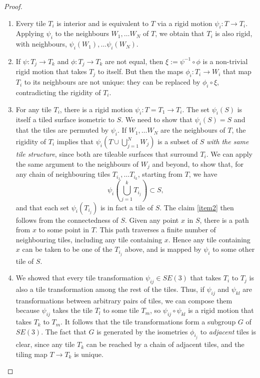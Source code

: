 \documentclass[11pt]{amsart}
\theoremstyle{remark}
\begin{document}
 \begin{proof}
 \begin{enumerate}
 \item Every tile $T_i$ is interior and is equivalent to $T$ via a rigid motion $\psi_i: T \to T_i$.
Applying $\psi_i$ to the neighbours $W_1, \dots W_N$ of $T$, we obtain that $T_i$ is also  rigid, with neighbours, $\psi_i(W_1),\dots \psi_i(W_N)$.
 \item 
 If $\psi: T_j \to T_k$ and $\phi: T_j \to T_k$  are not equal, then $\xi := \psi^{-1} \circ \phi$ is a non-trivial rigid motion that takes $T_j$ to itself. But then the maps $\phi_i: T_i \to W_i$ that map $T_i$ to its neighbours are not unique: 
 they can be replaced by $\phi_i \circ \xi$, contradicting the rigidity of $T_i$.
 \item
   For any tile $T_i$, there is a rigid motion $\psi_{i}: T=T_1 \to T_i$.    The set
   $\psi_i(S)$ is itself a tiled surface isometric to $S$. We need to show that $\psi_i(S)=S$ and that the tiles are permuted by $\psi_i$.  If $W_1, \dots W_N$ are the neighbours of $T$, the rigidity of $T_i$ implies that $\psi_i\left(T \cup \bigcup_{j=1}^N W_j \right)$ is a subset of $S$ \emph{with the
 same tile structure}, since
 both are tileable surfaces that surround $T_i$.
 We can apply the same argument to the neighbours of $W_j$ and beyond, to show that, for 
 any chain of neighbouring tiles $T_{i_1}, \dots T_{i_k}$,  starting from $T$, we have 
 \[
 \psi_i\left(\bigcup_{j=1}^k T_{i_j} \right) \subset S,
 \]
 and that each set $\psi_i(T_{i_j})$ is in fact a tile of $S$. The claim \ref{item2} then follows
 from the connectedness of $S$.  Given any point $x$ in $S$, there is a path from $x$ to some point
 in $T$. This path traverses a finite number of neighbouring tiles, including any tile containing $x$. 
 Hence any tile containing $x$ can be taken to be one of the $T_{i_j}$ above, and 
 is mapped by $\psi_i$ to some other tile of $S$.
 \item We showed that every tile transformation $\psi_{ij} \in SE(3)$ that takes $T_i$ to $T_j$ is also a tile
 transformation among the rest of the tiles.  Thus, if $\psi_{ij}$ and $\psi_{kl}$ are transformations between arbitrary pairs of tiles, we can compose them because $\psi_{ij}$ takes the tile $T_l$ to some tile $T_m$, so
 $\psi_{ij} \circ \psi_{kl}$ is a rigid motion that takes $T_k$ to $T_m$.  It follows that the  tile transformations form a subgroup $G$ of $SE(3)$.
 The fact that $G$ is generated by the isometries $\phi_{i_j}$ to \emph{adjacent} tiles is clear, since any tile $T_k$ can be 
 reached by a chain of adjacent tiles, and the tiling map $T \to T_k$ is unique. 
\end{enumerate}
 \end{proof}
 
\end{document}
